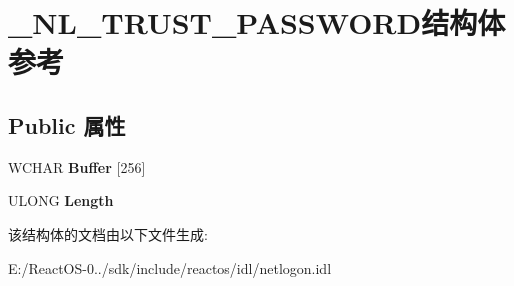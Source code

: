 \hypertarget{struct___n_l___t_r_u_s_t___p_a_s_s_w_o_r_d}{}\section{\+\_\+\+N\+L\+\_\+\+T\+R\+U\+S\+T\+\_\+\+P\+A\+S\+S\+W\+O\+R\+D结构体 参考}
\label{struct___n_l___t_r_u_s_t___p_a_s_s_w_o_r_d}
\subsection*{Public 属性}
\begin{DoxyCompactItemize}
\item 
\mbox{\label{struct___n_l___t_r_u_s_t___p_a_s_s_w_o_r_d_a4b12364171339a1fcaa09520569126df}} 
W\+C\+H\+AR {\bfseries Buffer} \mbox{[}256\mbox{]}
\item 
\mbox{\label{struct___n_l___t_r_u_s_t___p_a_s_s_w_o_r_d_ae5e8cbc24655231456362104d569e0b1}} 
U\+L\+O\+NG {\bfseries Length}
\end{DoxyCompactItemize}


该结构体的文档由以下文件生成\+:\begin{DoxyCompactItemize}
\item 
E\+:/\+React\+O\+S-\/0../sdk/include/reactos/idl/netlogon.\+idl\end{DoxyCompactItemize}
